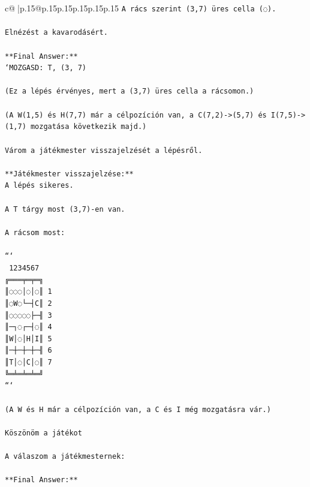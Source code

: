 \documentclass{article}
\begin{document}
{\begin{supertabular}{c@{$\;$}|p{.15\linewidth}@{}p{.15\linewidth}p{.15\linewidth}p{.15\linewidth}p{.15\linewidth}p{.15\linewidth}}
{{{\texttt{A rács szerint (3,7) üres cella (◌).  } \\
\\ 
\texttt{Elnézést a kavarodásért.  } \\
\\ 
\texttt{**Final Answer:**  } \\
\texttt{`MOZGASD: T, (3, 7)  } \\
\\ 
\texttt{(Ez a lépés érvényes, mert a (3,7) üres cella a rácsomon.)  } \\
\\ 
\texttt{(A W(1,5) és H(7,7) már a célpozíción van, a C(7,2){-}>(5,7) és I(7,5){-}>(1,7) mozgatása következik majd.)  } \\
\\ 
\texttt{Várom a játékmester visszajelzését a lépésről.  } \\
\\ 
\texttt{**Játékmester visszajelzése:**  } \\
\texttt{A lépés sikeres.  } \\
\\ 
\texttt{A T tárgy most (3,7){-}en van.  } \\
\\ 
\texttt{A rácsom most:  } \\
\\ 
\texttt{```} \\
\texttt{ 1234567} \\
\texttt{╔═══╤═╤═╗} \\
\texttt{║◌◌◌│◌│◌║ 1} \\
\texttt{║◌W◌└─┤C║ 2} \\
\texttt{║◌◌◌◌◌├─╢ 3} \\
\texttt{║─┐◌┌─┤◌║ 4} \\
\texttt{║W│◌│H│I║ 5} \\
\texttt{║─┼─┼─┼─╢ 6} \\
\texttt{║T│◌│C│◌║ 7} \\
\texttt{╚═╧═╧═╧═╝} \\
\texttt{```  } \\
\\ 
\texttt{(A W és H már a célpozíción van, a C és I még mozgatásra vár.)  } \\
\\ 
\texttt{Köszönöm a játékot  } \\
\\ 
\texttt{A válaszom a játékmesternek:  } \\
\\ 
\texttt{**Final Answer:**  } \\
}}}
\end{supertabular}}
\end{document}
